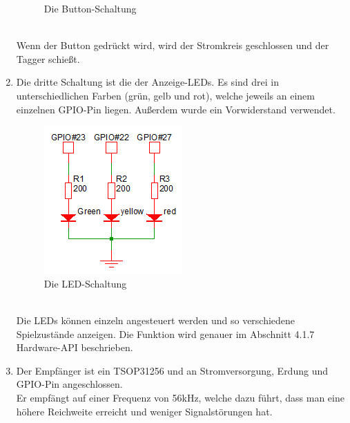 \begin{enumerate}
\begin{figure}[h]
		\caption{Die Button-Schaltung}
		\label{fig:Bild3Hardware}
	\end{figure}\\
	Wenn der Button gedrückt wird, wird der Stromkreis geschlossen und der Tagger schießt.
	\item Die dritte Schaltung ist die der Anzeige-LEDs. Es sind drei in unterschiedlichen Farben (grün, gelb und rot), welche jeweils an einem einzelnen GPIO-Pin liegen. Außerdem wurde ein Vorwiderstand verwendet.\\
	\begin{figure}[h]
		\centering
		\includegraphics[width=0.3 \textwidth]{./040-komponenten/010-hardware/LEDschaltung.png}
		\caption{Die LED-Schaltung}
		\label{fig:Bild4Hardware}
	\end{figure}\\
	Die LEDs können einzeln angesteuert werden und so verschiedene Spielzustände anzeigen. Die Funktion wird genauer im Abschnitt 4.1.7 Hardware-API beschrieben.
	\item Der Empfänger ist ein TSOP31256 und an Stromversorgung, Erdung und GPIO-Pin angeschlossen.\\
	Er empfängt auf einer Frequenz von 56kHz, welche dazu führt, dass man eine höhere Reichweite erreicht und weniger Signalstörungen hat.
	
	
	

	
	
	
	
	
\end{enumerate}

